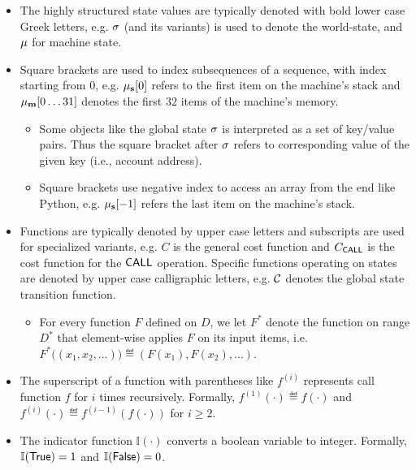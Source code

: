 \begin{itemize}[nosep]
	\item The highly structured state values are typically denoted with bold lower case Greek letters, e.g. $\mathbf{\sigma}$ (and its variants) is used to denote the world-state, and $\mathbf{\mu}$ for machine state.
		

	\item Square brackets are used to index subsequences of a sequence, with index starting from $0$, e.g. $\mathbf{\mu}_{\mathbf{s}}[0]$ refers to the first item on the machine's stack and $\mathbf{\mu}_{\mathbf{m}}[0\dots 31]$ denotes the first $32$ items of the machine's memory.
	\begin{itemize}[nosep]
		\item Some objects like the global state $\mathbf{\sigma}$ is interpreted as a set of key/value pairs.
		Thus the square bracket after $\mathbf{\sigma}$ refers to corresponding value of the given key (i.e., account address). 
		\item Square brackets use negative index to access an array from the end like Python, e.g. $\mathbf{\mu}_{\mathbf{s}}[-1]$ refers the last item on the machine's stack. 
	\end{itemize}


	\item Functions are typically denoted by upper case letters and subscripts are used for specialized variants, e.g. $C$ is the general cost function and $C_{\mathsf{CALL}}$ is the cost function for the $\mathsf{CALL}$ operation.
	Specific functions operating on states are denoted by upper case calligraphic letters, e.g. $\mathcal{C}$ denotes the {\name} global state transition function.
	\begin{itemize}[nosep]
		\item For every function $F$ defined on $D$, we let $F^*$ denote the function on range $D^*$ that element-wise applies $F$ on its input items, i.e. $F^*\big( \left(x_1, x_2, \dots\right) \big) \eqdef \left( F(x_1), F(x_2),\dots \right)$. 
	\end{itemize}

	\item The superscript of a function with parentheses like $f^{(i)}$ represents call function $f$ for $i$ times recursively. Formally, $f^{(1)}(\cdot)\eqdef f(\cdot)$ and $f^{(i)}(\cdot)\eqdef f^{(i-1)}(f(\cdot))$ for $i\ge 2$.
	
	\item The indicator function $\mathbb{I}(\cdot)$ converts a boolean variable to integer. Formally, $\mathbb{I}(\mathsf{True})=1$ and $\mathbb{I}(\mathsf{False})=0$.

\end{itemize}  

